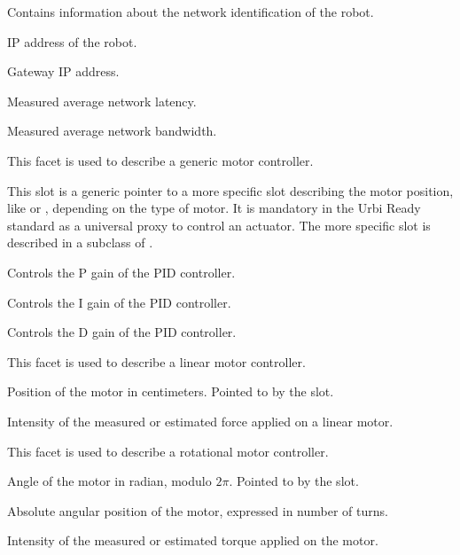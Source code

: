 
Contains information about the network identification of the robot.

\begin{slots}
  {%
    IP address of the robot.%
  }

  {%
    Gateway IP address.%
  }

  {%
    Measured average network latency.%
  }

  {%
    Measured average network bandwidth.%
  }

\end{slots}


This facet is used to describe a generic motor controller.

\begin{slots}
  {%
    This slot is a generic pointer to a more specific slot describing
    the motor position, like  or ,
    depending on the type of motor. It is mandatory in the Urbi Ready
    standard as a universal proxy to control an actuator. The more
    specific slot is described in a subclass of .%
  }

  {%
    Controls the P gain of the PID controller.%
  }

  {%
    Controls the I gain of the PID controller.%
  }

  {%
    Controls the D gain of the PID controller.%
  }

\end{slots}



This facet is used to describe a linear motor controller.

\begin{slots}
  {%
    Position of the motor in centimeters.  Pointed to by the
     slot.%
  }

  {%
    Intensity of the measured or estimated force applied on a linear
    motor.%
  }

\end{slots}



This facet is used to describe a rotational motor controller.

\begin{slots}
  {%
    Angle of the motor in radian, modulo $2\pi$. Pointed to by the
     slot.%
  }

  {%
    Absolute angular position of the motor, expressed in number of
    turns.%
  }

  {%
    Intensity of the measured or estimated torque applied on the
    motor.%
  }

\end{slots}


